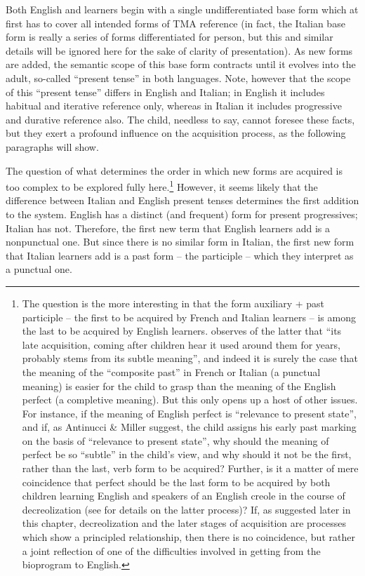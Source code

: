 Both English and  learners begin with a single undifferentiated base form which at first has to cover all intended forms of TMA reference (in fact, the Italian base form is really a series of forms differentiated for person, but this and similar details will be ignored here for the sake of clarity of presentation). As new forms are added, the semantic scope of this base form contracts until it evolves into the adult, so-called ``present tense'' in both languages. Note, however that the scope of this ``present tense'' differs in English and Italian; in English it includes habitual and iterative reference only, whereas in Italian it includes progressive and durative reference also. The child, needless to say, cannot foresee these facts, but they exert a profound influence on the acquisition process, as the following paragraphs will show.

The question of what determines the order in which new forms are acquired is too complex to be explored fully here.\enlargethispage{1\baselineskip}\footnote{The question is the more interesting in that the form auxiliary + past participle -- the first to be acquired by French and Italian learners -- is among the last to be acquired by English learners. \citet{Maratsos1979} observes of the latter that ``its late acquisition, coming after children hear it used around them for years, probably stems from its subtle meaning'', and indeed it is surely the case that the meaning of the ``composite past'' in French or Italian (a punctual meaning) is easier for the child to grasp than the meaning of the English perfect (a completive meaning). But this only opens up a host of other issues. For instance, if the meaning of English perfect is ``relevance to present state'', and if, as Antinucci \& Miller suggest, the child assigns his early past marking on the basis of ``relevance to present state'', why should the meaning of perfect be so ``subtle'' in the child's view, and why should it not be the first, rather than the last, verb form to be acquired? Further, is it a matter of mere coincidence that perfect should be the last form to be acquired by both children learning English and speakers of an English creole in the course of decreolization (see \citet[126ff.]{Bickerton1975} for details on the latter process)? If, as suggested later in this chapter, decreolization and the later stages of acquisition are processes which show a principled relationship, then there is no coincidence, but rather a joint reflection of one of the difficulties involved in getting from the bioprogram to English.} However, it seems likely that the difference between Italian and English present tenses determines the first addition to the system. English has a dis\-tinct (and frequent) form for present progressives; Italian has not. Therefore, the first new term that English learners add is a nonpunctual one. But since there is no similar form in Italian, the first new form that Italian learners add is a past form -- the participle -- which they interpret as a punctual one.

